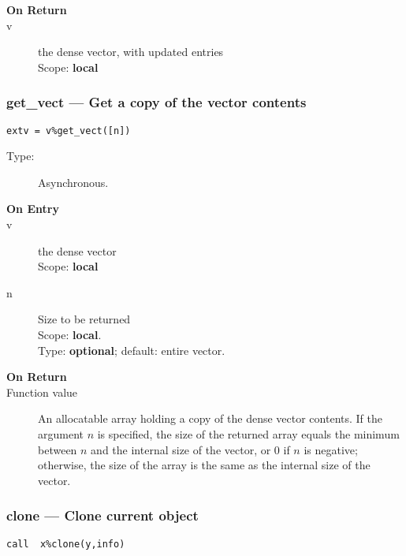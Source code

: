 \begin{description}
\item[\bf On Return]
\item[v] the dense vector, with updated entries\\
Scope: {\bf local}\\
\end{description}

\subsubsection*{get\_vect  --- Get a copy of the vector contents}

\begin{verbatim}
extv = v%get_vect([n])
\end{verbatim}

\begin{description}
\item[Type:] Asynchronous.
\item[\bf On Entry]
\item[v] the dense vector\\
Scope: {\bf local}\\
\item[n] Size to be returned\\
Scope: {\bf local}.\\
Type: {\bf optional}; default: entire vector.\\

\end{description}

\begin{description}
\item[\bf On Return]
\item[Function value] An allocatable array holding a copy of the dense
  vector contents. If the argument $n$ is specified, the size of the
  returned array equals the minimum between $n$ and the internal size
  of the vector, or 0 if $n$ is negative; otherwise, the size of the
  array is the same as the internal size of the vector.
\end{description}

\subsubsection*{clone --- Clone current object}
\begin{verbatim}
call  x%clone(y,info)
\end{verbatim}

